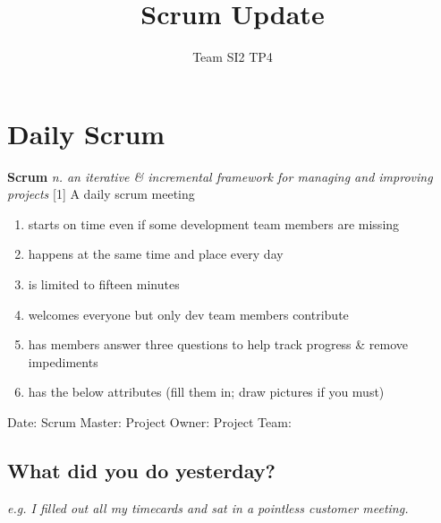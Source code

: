 \documentclass[12pt]{article}%
\begin{document}
\title{Scrum Update}
\author{Team SI2 TP4}
\maketitle

\section{Daily Scrum}
\textbf{Scrum} 
\textit{n. an iterative \& incremental framework for managing and improving projects} 
[1]
\newline 
\newline 
A daily scrum meeting
\begin{enumerate}[nosep, label=\textendash]
	\item starts on time even if some development team members are missing
    \item happens at the same time and place every day
    \item is limited to fifteen minutes 
    \item welcomes everyone but only dev team members contribute
    \item has members answer three questions to help track progress \& remove impediments
    \item has the below attributes (fill them in; draw pictures if you must)
\end{enumerate}
\hfill

\noindent
Date: \hspace{18mm} \underline{\hspace{3cm}}
\newline
Scrum Master: \hspace{3mm} \underline{\hspace{3cm}}
\newline
Project Owner: \hspace{2mm} \underline{\hspace{3cm}}
\newline
Project Team: \hspace{4mm} \underline{\hspace{3cm}}
\newline


\subsection{What did you do yesterday?}
\textit{e.g. I filled out all my timecards and sat in a pointless customer meeting.}
\newline 
\end{document}
